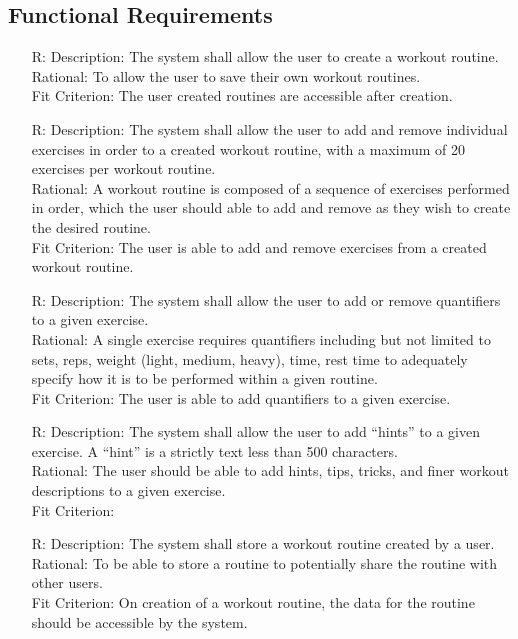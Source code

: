 \documentclass[12pt]{article}
\newcounter{reqnum} %
\begin{document}
\subsection{Functional Requirements}
\noindent \begin{itemize}

\item[R\refstepcounter{reqnum}\thereqnum \label{R_Inputs}:]
Description: The system shall allow the user to create a workout routine.
\\ Rational: To allow the user to save their own workout routines.
\\ Fit Criterion: The user created routines are accessible after creation.

\item[R\refstepcounter{reqnum}\thereqnum \label{R_Inputs}:]
Description: The system shall allow the user to add and remove individual exercises in order to a created workout routine, with a maximum of 20 exercises per workout routine.
\\ Rational: A workout routine is composed of a sequence of exercises performed in order, which the user should able to add and remove as they wish to create the desired routine.
\\ Fit Criterion: The user is able to add and remove exercises from a created workout routine.

\item[R\refstepcounter{reqnum}\thereqnum \label{R_Inputs}:]
Description: The system shall allow the user to add or remove quantifiers to a given exercise.
\\ Rational: A single exercise requires quantifiers including but not limited to sets, reps, weight (light, medium, heavy), time, rest time to adequately specify how it is to be performed within a given routine.
\\ Fit Criterion: The user is able to add quantifiers to a given exercise.

\item[R\refstepcounter{reqnum}\thereqnum \label{R_Inputs}:]
Description: The system shall allow the user to add ``hints'' to a given exercise. A ``hint'' is a strictly text less than 500 characters.
\\ Rational: The user should be able to add hints, tips, tricks, and finer workout descriptions to a given exercise.
\\ Fit Criterion: 

\item[R\refstepcounter{reqnum}\thereqnum \label{R_Inputs}:]
Description: The system shall store a workout routine created by a user. 
\\ Rational: To be able to store a routine to potentially share the routine with other users.
\\ Fit Criterion: On creation of a workout routine, the data for the routine should be accessible by the system.


\end{itemize}
\end{document}
